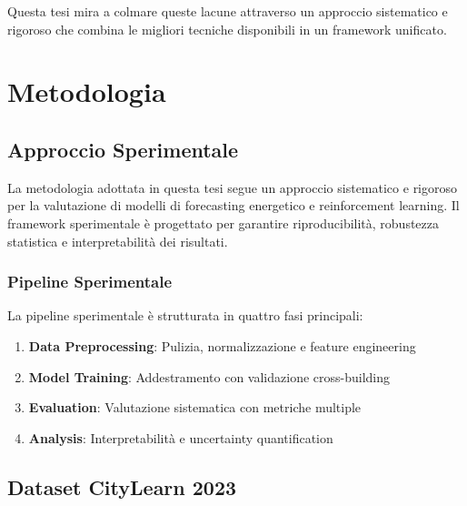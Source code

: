 \documentclass[12pt,a4paper,twoside]{report}
\begin{document}
Questa tesi mira a colmare queste lacune attraverso un approccio sistematico e rigoroso che combina le migliori tecniche disponibili in un framework unificato.






\chapter{Metodologia}

\section{Approccio Sperimentale}

La metodologia adottata in questa tesi segue un approccio sistematico e rigoroso per la valutazione di modelli di forecasting energetico e reinforcement learning. Il framework sperimentale è progettato per garantire riproducibilità, robustezza statistica e interpretabilità dei risultati.

\subsection{Pipeline Sperimentale}

La pipeline sperimentale è strutturata in quattro fasi principali:

\begin{enumerate}
    \item \textbf{Data Preprocessing}: Pulizia, normalizzazione e feature engineering
    \item \textbf{Model Training}: Addestramento con validazione cross-building
    \item \textbf{Evaluation}: Valutazione sistematica con metriche multiple
    \item \textbf{Analysis}: Interpretabilità e uncertainty quantification
\end{enumerate}

\section{Dataset CityLearn 2023}
\end{document}

